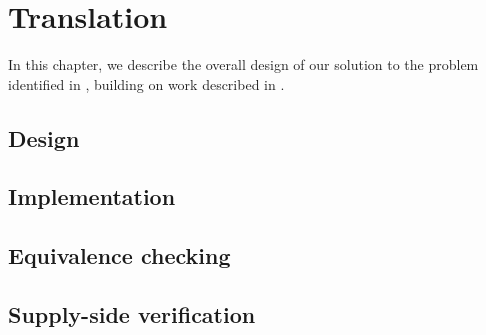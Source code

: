 \chapter{Translation}
\label{ch:translation} %

In this chapter, we describe the overall design of our solution to the problem identified in , building on work described in .

\section{Design}
\label{sec:translation-design} %


\section{Implementation}
\label{sec:translation-implementation} %

\section{Equivalence checking}
\label{sec:equivalence-checking} %

\section{Supply-side verification}
\label{sec:translation-supply-side-verification} %
